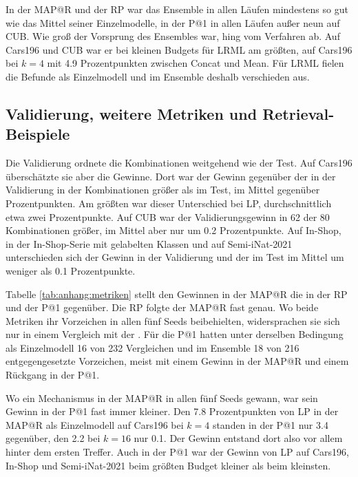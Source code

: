 In der \ac{MAP@R} und der \ac{RP} war das Ensemble in allen Läufen mindestens so gut wie das Mittel seiner Einzelmodelle, in der \ac{P@1} in allen Läufen außer neun auf \ac{CUB}. Wie groß der Vorsprung des Ensembles war, hing vom Verfahren ab. Auf Cars196 und \ac{CUB} war er bei kleinen Budgets für \ac{LRML} am größten, auf Cars196 bei $k=4$ mit \num{4.9} Prozentpunkten zwischen Concat und Mean. Für \ac{LRML} fielen die Befunde als Einzelmodell und im Ensemble deshalb verschieden aus.

\subsection{Validierung, weitere Metriken und Retrieval-Beispiele}
\label{sec:e:metriken}

Die Validierung ordnete die Kombinationen weitgehend wie der Test. Auf Cars196 überschätzte sie aber die Gewinne. Dort war der Gewinn gegenüber der \UEBL in der Validierung in  der  Kombinationen größer als im Test, im Mittel  gegenüber  Prozentpunkten. Am größten war dieser Unterschied bei \ac{LP}, durchschnittlich etwa zwei Prozentpunkte. Auf \ac{CUB} war der Validierungsgewinn in 62 der 80 Kombinationen größer, im Mittel aber nur um \num{0.2} Prozentpunkte. Auf In-Shop, in der In-Shop-Serie mit gelabelten Klassen und auf Semi-iNat-2021 unterschieden sich der Gewinn in der Validierung und der im Test im Mittel um weniger als \num{0.1} Prozentpunkte.

Tabelle \ref{tab:anhang:metriken} stellt den Gewinnen in der \ac{MAP@R} die in der \ac{RP} und der \ac{P@1} gegenüber. Die \ac{RP} folgte der \ac{MAP@R} fast genau. Wo beide Metriken ihr Vorzeichen in allen fünf Seeds beibehielten, widersprachen sie sich nur in einem Vergleich mit der \UEBL. Für die \ac{P@1} hatten unter derselben Bedingung als Einzelmodell 16 von 232 Vergleichen und im Ensemble 18 von 216 entgegengesetzte Vorzeichen, meist mit einem Gewinn in der \ac{MAP@R} und einem Rückgang in der \ac{P@1}.

Wo ein Mechanismus in der \ac{MAP@R} in allen fünf Seeds gewann, war sein Gewinn in der \ac{P@1} fast immer kleiner. Den \num{7.8} Prozentpunkten von \ac{LP} in der \ac{MAP@R} als Einzelmodell auf Cars196 bei $k=4$ standen in der \ac{P@1} nur \num{3.4} gegenüber, den \num{2.2} bei $k=16$ nur \num{0.1}. Der Gewinn entstand dort also vor allem hinter dem ersten Treffer. Auch in der \ac{P@1} war der Gewinn von \ac{LP} auf Cars196, In-Shop und Semi-iNat-2021 beim größten Budget kleiner als beim kleinsten.

